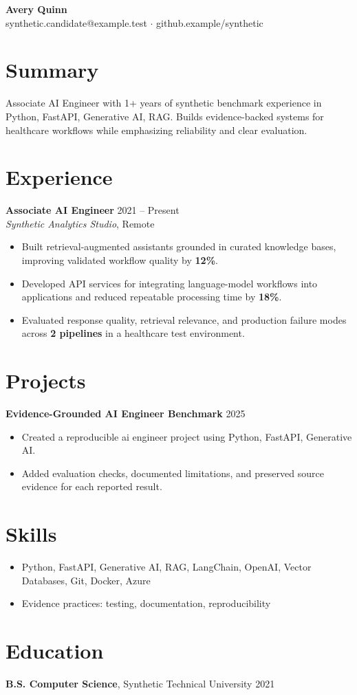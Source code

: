 \documentclass[10pt,letterpaper]{article}
\begin{document}
\begin{center}
{\Large \textbf{Avery Quinn}}\\
synthetic.candidate@example.test $\cdot$ github.example/synthetic
\end{center}

\section*{Summary}
Associate AI Engineer with 1+ years of synthetic benchmark experience in Python, FastAPI, Generative AI, RAG. Builds evidence-backed systems for healthcare workflows while emphasizing reliability and clear evaluation.

\section*{Experience}
\textbf{Associate AI Engineer} \hfill 2021 -- Present\\
\textit{Synthetic Analytics Studio}, Remote
\begin{itemize}
  \item Built retrieval-augmented assistants grounded in curated knowledge bases, improving validated workflow quality by \textbf{12\%}.
  \item Developed API services for integrating language-model workflows into applications and reduced repeatable processing time by \textbf{18\%}.
  \item Evaluated response quality, retrieval relevance, and production failure modes across \textbf{2 pipelines} in a healthcare test environment.
\end{itemize}

\section*{Projects}
\textbf{Evidence-Grounded AI Engineer Benchmark} \hfill 2025
\begin{itemize}
  \item Created a reproducible ai engineer project using Python, FastAPI, Generative AI.
  \item Added evaluation checks, documented limitations, and preserved source evidence for each reported result.
\end{itemize}

\section*{Skills}
\begin{itemize}
  \item Python, FastAPI, Generative AI, RAG, LangChain, OpenAI, Vector Databases, Git, Docker, Azure
  \item Evidence practices: testing, documentation, reproducibility
\end{itemize}

\section*{Education}
\textbf{B.S. Computer Science}, Synthetic Technical University \hfill 2021
\end{document}
